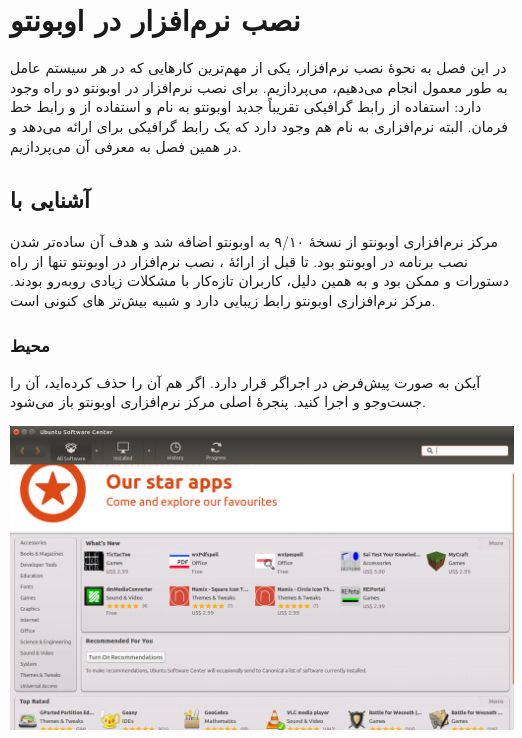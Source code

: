 \chapter{نصب نرم‌افزار در اوبونتو}
در این فصل به نحوهٔ نصب نرم‌افزار، یکی از مهم‌ترین کارهایی که در هر سیستم عامل به طور معمول انجام می‌دهیم، می‌پردازیم. برای نصب نرم‌افزار در اوبونتو دو راه وجود دارد: استفاده از رابط گرافیکی تقریباً جدید اوبونتو به نام  و استفاده از  و رابط خط فرمان. البته نرم‌افزاری به نام  هم وجود دارد که یک رابط گرافیکی برای  ارائه می‌دهد و در همین فصل به معرفی آن می‌پردازیم.

\section[آشنایی با Center Software Ubuntu]{آشنایی با }
مرکز نرم‌افزاری اوبونتو از نسخهٔ ۹/۱۰ به اوبونتو اضافه شد و هدف آن ساده‌تر شدن نصب برنامه در اوبونتو بود. تا قبل از ارائهٔ ، نصب نرم‌افزار در اوبونتو تنها از راه دستورات  و  ممکن بود و به همین دلیل، کاربران تازه‌کار با مشکلات زیادی روبه‌رو بودند. مرکز نرم‌افزاری اوبونتو رابط زیبایی دارد و شبیه بیش‌تر های کنونی است.

\subsection[محیط Center Software Ubuntu]{محیط }
آیکن  به صورت پیش‌فرض در اجراگر قرار دارد. اگر هم آن را حذف کرده‌اید، آن را جست‌وجو و اجرا کنید. پنجرهٔ اصلی مرکز نرم‌افزاری اوبونتو باز می‌شود.

\begin{center}
\includegraphics[scale=0.4]{pics/35.png}
\end{center}

